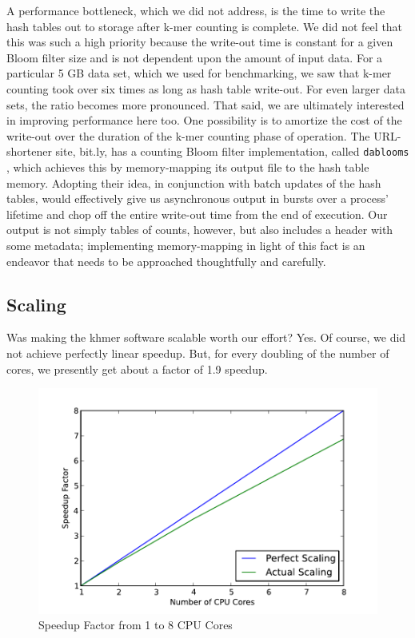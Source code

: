 \documentclass{article}
\begin{document}
A performance bottleneck, which we did not address, is the time to write the
hash tables out to storage after k-mer counting is complete. We did not feel
that this was such a high priority because the write-out time is constant for a
given Bloom filter size and is not dependent upon the amount of input data.
For a particular 5 GB data set, which we used for benchmarking, we saw that
k-mer counting took over six times as long as hash table write-out. For even
larger data sets, the ratio becomes more pronounced. That said, we are
ultimately interested in improving performance here too. One possibility is to
amortize the cost of the write-out over the duration of the k-mer counting
phase of operation. The URL-shortener site, bit.ly, has a counting Bloom filter
implementation, called \texttt{dablooms} \citep{web:dablooms}, which achieves
this by memory-mapping its output file to the hash table memory. Adopting their
idea, in conjunction with batch updates of the hash tables, would effectively
give us asynchronous output in bursts over a process' lifetime and chop off the
entire write-out time from the end of execution. Our output is not simply
tables of counts, however, but also includes a header with some metadata;
implementing memory-mapping in light of this fact is an endeavor that needs to
be approached thoughtfully and carefully.

\subsection{Scaling}

Was making the khmer software scalable worth our effort? Yes. Of course, we did
not achieve perfectly linear speedup. But, for every doubling of the number of
cores, we presently get about a factor of 1.9 speedup.

\begin{figure}[ht!]
\centering
\includegraphics[scale=0.75]{scaling.pdf}
\caption{Speedup Factor from 1 to 8 CPU Cores}
\label{khmerScaling}
\end{figure}
\end{document}
